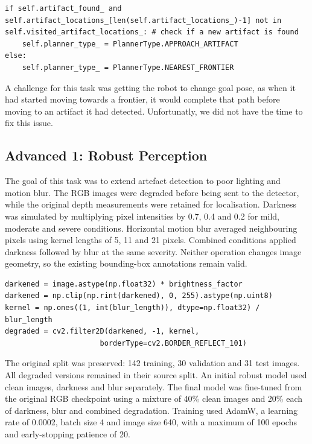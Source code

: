 \documentclass[a4paper,11pt]{article}
\begin{document}
\begin{lstlisting}[caption={Approach the last seen artifact}, label={lst:planning-artifact-detection-check}]
if self.artifact_found_ and self.artifact_locations_[len(self.artifact_locations_)-1] not in self.visited_artifact_locations_: # check if a new artifact is found
    self.planner_type_ = PlannerType.APPROACH_ARTIFACT
else:
    self.planner_type_ = PlannerType.NEAREST_FRONTIER
\end{lstlisting}

A challenge for this task was getting the robot to change goal pose, as when it had started moving towards a frontier, it would complete that path before moving to an artifact it had detected.
Unfortunatly, we did not have the time to fix this issue.

\subsection{Advanced 1: Robust Perception}
The goal of this task was to extend artefact detection to poor lighting and
motion blur. The RGB images were degraded before being sent to the detector,
while the original depth measurements were retained for localisation. Darkness
was simulated by multiplying pixel intensities by 0.7, 0.4 and 0.2 for mild,
moderate and severe conditions. Horizontal motion blur averaged neighbouring
pixels using kernel lengths of 5, 11 and 21 pixels. Combined conditions applied
darkness followed by blur at the same severity. Neither operation changes image
geometry, so the existing bounding-box annotations remain valid.

\begin{lstlisting}[caption={Core darkness and horizontal motion-blur operations, with input checks omitted}, label={lst:advanced-degradation}]
darkened = image.astype(np.float32) * brightness_factor
darkened = np.clip(np.rint(darkened), 0, 255).astype(np.uint8)
kernel = np.ones((1, int(blur_length)), dtype=np.float32) / blur_length
degraded = cv2.filter2D(darkened, -1, kernel,
                      borderType=cv2.BORDER_REFLECT_101)
\end{lstlisting}

The original split was preserved: 142 training, 30 validation and 31 test images.
All degraded versions remained in their source split. An initial robust model
used clean images, darkness and blur separately. The final model was fine-tuned
from the original RGB checkpoint using a mixture of 40\% clean images and 20\%
each of darkness, blur and combined degradation. Training used AdamW, a learning
rate of 0.0002, batch size 4 and image size 640, with a maximum of 100 epochs
and early-stopping patience of 20.
\end{document}
